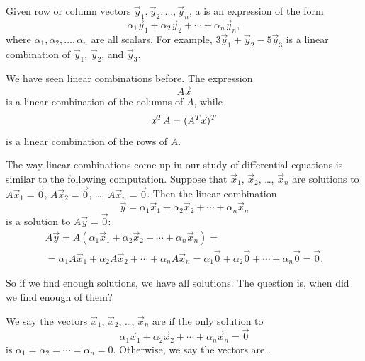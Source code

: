 Given row or column vectors $\vec{y}_1, \vec{y}_2, \ldots, \vec{y}_n$,
a \emph{} is an expression of the form
\begin{equation*}
\alpha_1 \vec{y}_1 +
\alpha_2 \vec{y}_2 +
\cdots +
\alpha_n \vec{y}_n ,
\end{equation*}
where $\alpha_1, \alpha_2, \ldots, \alpha_n$ are all scalars.
For example,
$3 \vec{y}_1 + \vec{y}_2 - 5 \vec{y}_3$ is a linear combination
of $\vec{y}_1$, $\vec{y}_2$, and $\vec{y}_3$.

We have seen linear combinations before.  The expression
\begin{equation*}
A \vec{x}
\end{equation*}
is a linear combination of the columns of $A$, while
\begin{equation*}
\vec{x}^T A = (A^T \vec{x})^T
\avoidbreak
\end{equation*}
is a linear combination of the rows of $A$.

The way linear combinations come up in our study of differential
equations is similar to the following computation.  Suppose that
$\vec{x}_1$, $\vec{x}_2$, \ldots, $\vec{x}_n$ are solutions
to $A \vec{x}_1 = \vec{0}$,
$A \vec{x}_2 = \vec{0}$, \ldots,
$A \vec{x}_n = \vec{0}$.
Then the linear combination
\begin{equation*}
\vec{y} = \alpha_1 \vec{x}_1 +
\alpha_2 \vec{x}_2 +
\cdots +
\alpha_n \vec{x}_n
\end{equation*}
is a solution to $A \vec{y} = \vec{0}$:
\begin{multline*}
A \vec{y} =
A (\alpha_1 \vec{x}_1 +
\alpha_2 \vec{x}_2 +
\cdots +
\alpha_n \vec{x}_n )
=
\\
=
\alpha_1 A \vec{x}_1 +
\alpha_2 A \vec{x}_2 +
\cdots +
\alpha_n A \vec{x}_n
=
\alpha_1 \vec{0} +
\alpha_2 \vec{0} +
\cdots +
\alpha_n \vec{0} = \vec{0} .
\end{multline*}

So if we find enough solutions, we have all solutions.  The question is,
when did we find enough of them?

We say the vectors $\vec{x}_1$, $\vec{x}_2$, \ldots, $\vec{x}_n$ are
\emph{} if the only solution to
\begin{equation*}
\alpha_1 \vec{x}_1 +
\alpha_2 \vec{x}_2 +
\cdots +
\alpha_n \vec{x}_n
=
\vec{0}
\end{equation*}
is $\alpha_1 = \alpha_2 = \cdots = \alpha_n = 0$.
Otherwise, we say the vectors are \emph{}.

